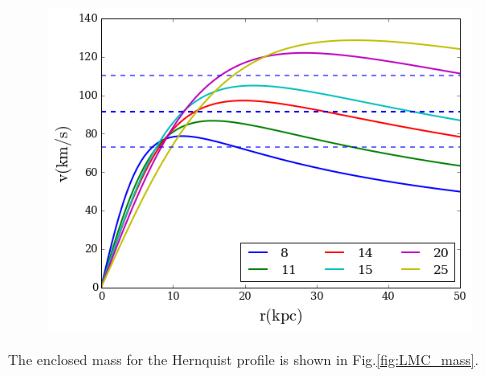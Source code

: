 \begin{figure}[H]{\label{fig:LMC_rotcurve_p}}
\centering
\includegraphics[scale=0.4]{LMC_rotcurve_plummer.png}
\end{figure}





The enclosed mass for the Hernquist profile is shown in Fig.\ref{fig:LMC_mass}.

